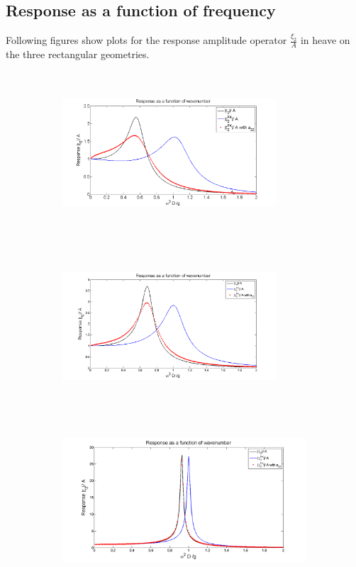 \documentclass[a4paper,10pt]{article}
\begin{document}
\subsection{Response as a function of frequency}

Following figures show plots for the response amplitude operator $\frac{\xi_2}{A}$ in heave on the three rectangular geometries.

\begin{figure}[H]
 \centering
 
\begin{subfigure}{0.45\textwidth}
\includegraphics[width=8cm, height=6cm]{respons1.png} 
\caption{}
\label{respons1}
\end{subfigure}
\begin{subfigure}{0.4\textwidth}
\includegraphics[width=8cm, height=6cm]{respons2.png}
\caption{}
\label{respons2}
\end{subfigure}

\begin{subfigure}{0.6\textwidth}
\centering
\includegraphics[width=12cm, height=6cm]{respons.png}
\caption{}
\label{respons3}
\end{subfigure}

\caption{}
\label{heave_response}
\end{figure}
\end{document}
